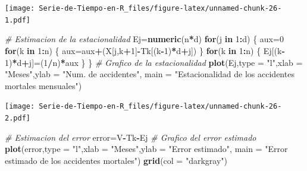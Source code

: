 \documentclass[12pt,]{krantz}
\makeatletter
\newenvironment{Shaded}{\begin{snugshade}}{\end{snugshade}}
\newcommand{\KeywordTok}[1]{\textcolor[rgb]{0.13,0.29,0.53}{\textbf{#1}}}
\newcommand{\DataTypeTok}[1]{\textcolor[rgb]{0.13,0.29,0.53}{#1}}
\newcommand{\DecValTok}[1]{\textcolor[rgb]{0.00,0.00,0.81}{#1}}
\newcommand{\StringTok}[1]{\textcolor[rgb]{0.31,0.60,0.02}{#1}}
\newcommand{\CommentTok}[1]{\textcolor[rgb]{0.56,0.35,0.01}{\textit{#1}}}
\newcommand{\ControlFlowTok}[1]{\textcolor[rgb]{0.13,0.29,0.53}{\textbf{#1}}}
\newcommand{\OperatorTok}[1]{\textcolor[rgb]{0.81,0.36,0.00}{\textbf{#1}}}
\newcommand{\NormalTok}[1]{#1}
\newenvironment{kframe}{%
\medskip{}
\setlength{\fboxsep}{.8em}
 \def\at@end@of@kframe{}%
 \ifinner\ifhmode%
  \def\at@end@of@kframe{\end{minipage}}%
  \begin{minipage}{\columnwidth}%
 \fi\fi%
 \def\FrameCommand##1{\hskip\@totalleftmargin \hskip-\fboxsep
 \colorbox{shadecolor}{##1}\hskip-\fboxsep
     \hskip-\linewidth \hskip-\@totalleftmargin \hskip\columnwidth}%
 \MakeFramed {\advance\hsize-\width
   \@totalleftmargin\z@ \linewidth\hsize
   \@setminipage}}%
 {\par\unskip\endMakeFramed%
 \at@end@of@kframe}
\renewenvironment{Shaded}{\begin{kframe}}{\end{kframe}}
\theoremstyle{definition}
\theoremstyle{definition}
\theoremstyle{definition}
\theoremstyle{remark}
\makeatother
\begin{document}
\texttt{[image: Serie-de-Tiempo-en-R\_files/figure-latex/unnamed-chunk-26-1.pdf]}

\begin{Shaded}
\begin{Highlighting}[]
\CommentTok{# Estimacion de la estacionalidad}
\NormalTok{Ej=}\KeywordTok{numeric}\NormalTok{(n}\OperatorTok{*}\NormalTok{d)}
\ControlFlowTok{for}\NormalTok{(j }\ControlFlowTok{in} \DecValTok{1}\OperatorTok{:}\NormalTok{d)}
\NormalTok{\{}
\NormalTok{  aux=}\DecValTok{0}
  \ControlFlowTok{for}\NormalTok{(k }\ControlFlowTok{in} \DecValTok{1}\OperatorTok{:}\NormalTok{n)}
\NormalTok{  \{}
\NormalTok{    aux=aux}\OperatorTok{+}\NormalTok{(X[j,k}\OperatorTok{+}\DecValTok{1}\NormalTok{]}\OperatorTok{-}\NormalTok{Tk[(k}\OperatorTok{-}\DecValTok{1}\NormalTok{)}\OperatorTok{*}\NormalTok{d}\OperatorTok{+}\NormalTok{j])}
\NormalTok{  \}}
  \ControlFlowTok{for}\NormalTok{(k }\ControlFlowTok{in} \DecValTok{1}\OperatorTok{:}\NormalTok{n)}
\NormalTok{  \{}
\NormalTok{    Ej[(k}\OperatorTok{-}\DecValTok{1}\NormalTok{)}\OperatorTok{*}\NormalTok{d}\OperatorTok{+}\NormalTok{j]=(}\DecValTok{1}\OperatorTok{/}\NormalTok{n)}\OperatorTok{*}\NormalTok{aux}
\NormalTok{  \}}
\NormalTok{\}}
\CommentTok{# Grafico de la estacionalidad}
\KeywordTok{plot}\NormalTok{(Ej,}\DataTypeTok{type =} \StringTok{"l"}\NormalTok{,}\DataTypeTok{xlab =} \StringTok{"Meses"}\NormalTok{,}\DataTypeTok{ylab =} \StringTok{"Num. de accidentes"}\NormalTok{,}
     \DataTypeTok{main =} \StringTok{"Estacionalidad de los accidentes mortales mensuales"}\NormalTok{)}
\end{Highlighting}
\end{Shaded}

\texttt{[image: Serie-de-Tiempo-en-R\_files/figure-latex/unnamed-chunk-26-2.pdf]}

\begin{Shaded}
\begin{Highlighting}[]
\CommentTok{# Estimacion del error}
\NormalTok{error=V}\OperatorTok{-}\NormalTok{Tk}\OperatorTok{-}\NormalTok{Ej}
\CommentTok{# Grafico del error estimado}
\KeywordTok{plot}\NormalTok{(error,}\DataTypeTok{type =} \StringTok{"l"}\NormalTok{,}\DataTypeTok{xlab =} \StringTok{"Meses"}\NormalTok{,}\DataTypeTok{ylab =} \StringTok{"Error estimado"}\NormalTok{,}
     \DataTypeTok{main =} \StringTok{"Error estimado de los accidentes mortales"}\NormalTok{)}
\KeywordTok{grid}\NormalTok{(}\DataTypeTok{col =} \StringTok{"darkgray"}\NormalTok{)     }
\end{Highlighting}
\end{Shaded}
\end{document}

